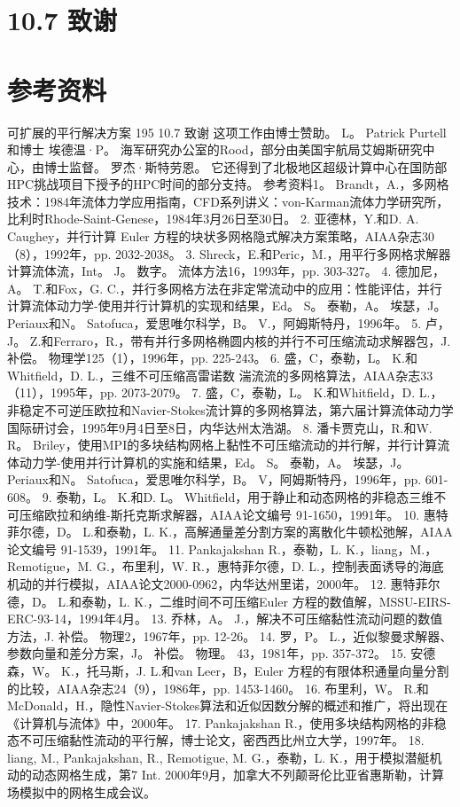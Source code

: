 \documentclass[UTF8,11pt,a4paper,openany,fontset=fandol]{ctexbook}
\begin{document}
\section{10.7 致谢}
\section{参考资料}
可扩展的平行解决方案 195 10.7 致谢 这项工作由博士赞助。 L。 Patrick Purtell和博士 埃德温·P。 海军研究办公室的Rood，部分由美国宇航局艾姆斯研究中心，由博士监督。 罗杰·斯特劳恩。 它还得到了北极地区超级计算中心在国防部HPC挑战项目下授予的HPC时间的部分支持。 参考资料1。 Brandt，A.，多网格技术：1984年流体力学应用指南，CFD系列讲义：von-Karman流体力学研究所，比利时Rhode-Saint-Genese，1984年3月26日至30日。 2. 亚德林，Y.和D. A. Caughey，并行计算 Euler 方程的块状多网格隐式解决方案策略，AIAA杂志30（8），1992年，pp. 2032-2038。 3. Shreck，E.和Peric，M.，用平行多网格求解器计算流体流，Int。 J。 数字。 流体方法16，1993年，pp. 303-327。 4. 德加尼，A。 T.和Fox，G. C.，并行多网格方法在非定常流动中的应用：性能评估，并行计算流体动力学-使用并行计算机的实现和结果，Ed。 S。 泰勒，A。 埃瑟，J。 Periaux和N。 Satofuca，爱思唯尔科学，B。 V.，阿姆斯特丹，1996年。 5. 卢，J。 Z.和Ferraro，R.，带有并行多网格椭圆内核的并行不可压缩流动求解器包，J. 补偿。 物理学125（1），1996年，pp. 225-243。 6. 盛，C，泰勒，L。 K.和Whitfield，D. L.，三维不可压缩高雷诺数 湍流流的多网格算法，AIAA杂志33（11），1995年，pp. 2073-2079。 7. 盛，C，泰勒，L。 K.和Whitfield，D. L.，非稳定不可逆压欧拉和Navier-Stokes流计算的多网格算法，第六届计算流体动力学国际研讨会，1995年9月4日至8日，内华达州太浩湖。 8. 潘卡贾克山，R.和W. R。 Briley，使用MPI的多块结构网格上黏性不可压缩流动的并行解，并行计算流体动力学-使用并行计算机的实施和结果，Ed。 S。 泰勒，A。 埃瑟，J。 Periaux和N。 Satofuca，爱思唯尔科学，B。 V，阿姆斯特丹，1996年，pp. 601-608。 9. 泰勒，L。 K.和D. L。 Whitfield，用于静止和动态网格的非稳态三维不可压缩欧拉和纳维-斯托克斯求解器，AIAA论文编号 91-1650，1991年。 10. 惠特菲尔德，D。 L.和泰勒，L. K.，高解通量差分割方案的离散化牛顿松弛解，AIAA论文编号 91-1539，1991年。 11. Pankajakshan R.，泰勒，L. K.，liang，M.，Remotigue，M. G.，布里利，W. R.，惠特菲尔德，D. L.，控制表面诱导的海底机动的并行模拟，AIAA论文2000-0962，内华达州里诺，2000年。 12. 惠特菲尔德，D。 L.和泰勒，L. K.，二维时间不可压缩Euler 方程的数值解，MSSU-EIRS-ERC-93-14，1994年4月。 13. 乔林，A。 J.，解决不可压缩黏性流动问题的数值方法，J. 补偿。 物理2，1967年，pp. 12-26。 14. 罗，P。 L.，近似黎曼求解器、参数向量和差分方案，J。 补偿。 物理。 43，1981年，pp. 357-372。 15. 安德森，W。 K.，托马斯，J. L.和van Leer，B，Euler 方程的有限体积通量向量分割的比较，AIAA杂志24（9），1986年，pp. 1453-1460。 16. 布里利，W。 R.和McDonald，H.，隐性Navier-Stokes算法和近似因数分解的概述和推广，将出现在《计算机与流体》中，2000年。 17. Pankajakshan R.，使用多块结构网格的非稳态不可压缩黏性流动的平行解，博士论文，密西西比州立大学，1997年。 18. liang, M., Pankajakshan, R., Remotigue, M. G.，泰勒，L. K.，用于模拟潜艇机动的动态网格生成，第7 Int. 2000年9月，加拿大不列颠哥伦比亚省惠斯勒，计算场模拟中的网格生成会议。
\end{document}
